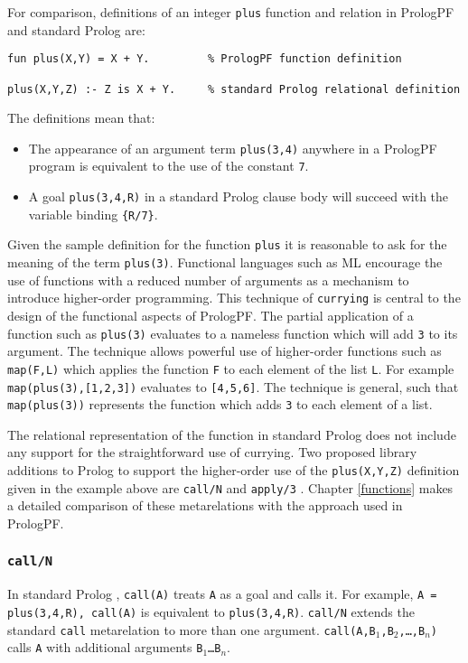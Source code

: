 For comparison, definitions of an integer \texttt{plus} function and relation in
PrologPF and standard Prolog are:
\begin{verbatim}
fun plus(X,Y) = X + Y.         % PrologPF function definition

plus(X,Y,Z) :- Z is X + Y.     % standard Prolog relational definition
\end{verbatim}
The definitions mean that:
\begin{itemize}
\item{The appearance of an argument term \texttt{plus(3,4)} anywhere in a 
  PrologPF program is equivalent to the use of the constant \texttt{7}.}
\item{A goal \texttt{plus(3,4,R)} in a standard Prolog clause body will
  succeed with the variable binding \texttt{\{R/7\}}.}
\end{itemize}
Given the sample definition for the function \texttt{plus} it is reasonable to
ask for the meaning of the term \texttt{plus(3)}.  Functional languages such
as ML \cite{MTH90, Pau91} encourage the use of functions with a reduced number of
arguments as a mechanism to introduce higher-order programming.  This technique
of \texttt{currying} \cite{Cur30,Sch24} is central to the design of the functional
aspects of PrologPF.  The partial application of a function such as \texttt{plus(3)}
evaluates to a nameless function which will add \texttt{3} to its argument.  The
technique allows powerful use of higher-order functions such as \texttt{map(F,L)}
which applies the function \texttt{F} to each element of the list \texttt{L}. For
example \texttt{map(plus(3),[1,2,3])} evaluates to \texttt{[4,5,6]}.
The technique is general, such that \texttt{map(plus(3))} represents the function
which adds \texttt{3} to each element of a list.

The relational representation of the function in standard Prolog does not include any
support for the straightforward use of currying.  Two proposed
library additions to Prolog to
support the higher-order use of the \texttt{plus(X,Y,Z)} definition given in the example
above are \texttt{call/N} and \texttt{apply/3} \cite{Nai96}.  Chapter \ref{functions}
makes a detailed comparison of these metarelations with the approach used in PrologPF.

\subsubsection{\texttt{call/N}}

In standard Prolog \cite{DEDC96}, \texttt{call(A)} treats \texttt{A} as a
goal and calls it.  For example, \texttt{A = plus(3,4,R), call(A)} is equivalent
to \texttt{plus(3,4,R)}.  \texttt{call/N} \cite{Nai96}
extends the standard \texttt{call} metarelation to more than one argument.
\texttt{call(A,B$_1$,B$_2$,\ldots,B$_n$)} calls \texttt{A} with additional
arguments \texttt{B$_1$\ldots B$_n$}.

